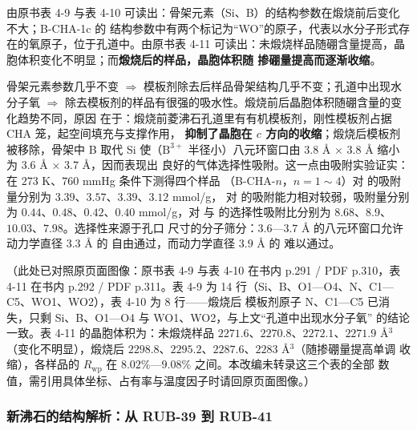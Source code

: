 \begin{obs}
由原书表 4-9 与表 4-10 可读出：骨架元素（Si、B）的结构参数在煅烧前后变化不大；B-CHA-1c 的
结构参数中有两个标记为``WO''的原子，代表以水分子形式存在的氧原子，位于孔道中。由原书表 4-11
可读出：未煅烧样品随硼含量提高，晶胞体积变化不明显；而\textbf{煅烧后的样品，晶胞体积随
掺硼量提高而逐渐收缩}。
\end{obs}
\begin{infer}
骨架元素参数几乎不变 $\Rightarrow$ 模板剂除去后样品骨架结构几乎不变；孔道中出现水分子氧
$\Rightarrow$ 除去模板剂的样品有很强的吸水性。煅烧前后晶胞体积随硼含量的变化趋势不同，原因
在于：煅烧前菱沸石孔道里有有机模板剂，刚性模板剂占据 CHA 笼，起空间填充与支撑作用，
\textbf{抑制了晶胞在 $c$ 方向的收缩}；煅烧后模板剂被移除，骨架中 B 取代 Si 使（$\mathrm{B^{3+}}$
半径小）八元环窗口由 $3.8$ Å $\times$ $3.8$ Å 缩小为 $3.6$ Å $\times$ $3.7$ Å，因而表现出
良好的气体选择性吸附。这一点由吸附实验证实：在 $273$ K、$760$ mmHg 条件下测得四个样品
（B-CHA-$n$，$n=1\sim4$）对  的吸附量分别为 $3.39$、$3.57$、$3.39$、$3.12$ mmol/g，
对  的吸附能力相对较弱，吸附量分别为 $0.44$、$0.48$、$0.42$、$0.40$ mmol/g，对
 与  的选择性吸附比分别为 $8.68$、$8.9$、$10.03$、$7.98$。选择性来源于孔口
尺寸的分子筛分：$3.6$—$3.7$ Å 的八元环窗口允许
动力学直径 $3.3$ Å 的  自由通过，而动力学直径 $3.9$ Å 的  难以通过。
\end{infer}
（此处已对照原页面图像：原书表 4-9 与表 4-10 在书内 p.291 / PDF p.310，表 4-11 在书内 p.292 /
PDF p.311。表 4-9 为 14 行（Si、B、O1—O4、N、C1—C5、WO1、WO2），表 4-10 为 8 行——煅烧后
模板剂原子 N、C1—C5 已消失，只剩 Si、B、O1—O4 与 WO1、WO2，与上文``孔道中出现水分子氧''
的结论一致。表 4-11 的晶胞体积为：未煅烧样品 $2271.6$、$2270.8$、$2272.1$、$2271.9$ Å$^{3}$
（变化不明显），煅烧后 $2298.8$、$2295.2$、$2287.6$、$2283$ Å$^{3}$（随掺硼量提高单调
收缩），各样品的 $R_{\mathrm{wp}}$ 在 $8.02\%$—$9.08\%$ 之间。本改编未转录这三个表的全部
数值，需引用具体坐标、占有率与温度因子时请回原页面图像。）

\subsubsection{新沸石的结构解析：从 RUB-39 到 RUB-41}

